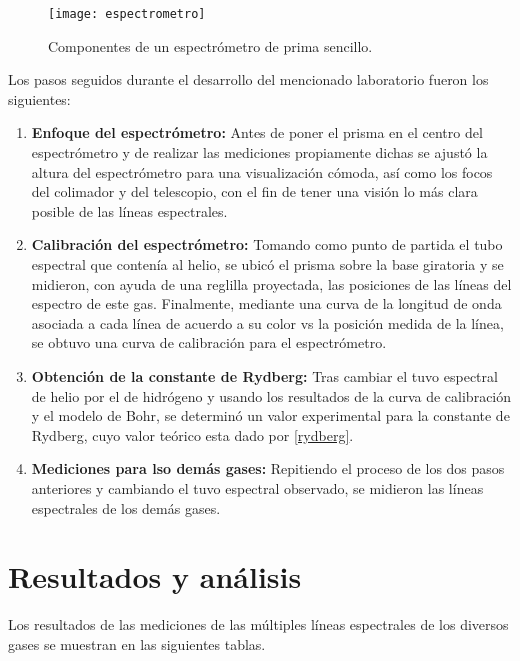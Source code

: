 \documentclass[prb,aps,twocolumn,preprintnumbers,amsmath,amssymb]{revtex4}
\begin{document}
\begin{figure}[h!]
	\centering
	\texttt{[image: espectrometro]}
	\caption{Componentes de un espectrómetro de prima sencillo.}
\end{figure}

Los pasos seguidos durante el desarrollo del mencionado laboratorio fueron los siguientes:
\\

\begin{enumerate}
	\item \textbf{Enfoque del espectrómetro:} Antes de poner el prisma en el centro del espectrómetro y de realizar las mediciones propiamente dichas se ajustó la altura del espectrómetro para una visualización cómoda, así como los focos del colimador y del telescopio, con el fin de tener una visión lo más clara posible de las líneas espectrales.
	
	\item \textbf{Calibración del espectrómetro:} Tomando como punto de partida el tubo espectral que contenía al helio, se ubicó el prisma sobre la base giratoria y se midieron, con ayuda de una reglilla proyectada, las posiciones de las líneas del espectro de este gas. Finalmente, mediante una curva de la longitud de onda asociada a cada línea de acuerdo a su color vs la posición medida de la línea, se obtuvo una curva de calibración para el espectrómetro.
	
	\item \textbf{Obtención de la constante de Rydberg:} Tras cambiar el tuvo espectral de helio por el de hidrógeno  y usando los resultados de la curva de calibración y el modelo de Bohr, se determinó un valor experimental para la constante de Rydberg, cuyo valor teórico esta dado por \eqref{rydberg}.
	
	\item \textbf{Mediciones para lso demás gases:} Repitiendo el proceso de los dos pasos anteriores y cambiando el tuvo espectral observado, se midieron las líneas espectrales de los demás gases.
\end{enumerate}

\section{Resultados y análisis}

Los resultados de las mediciones de las múltiples líneas espectrales de los diversos gases se muestran en las siguientes tablas.\\
\end{document}
